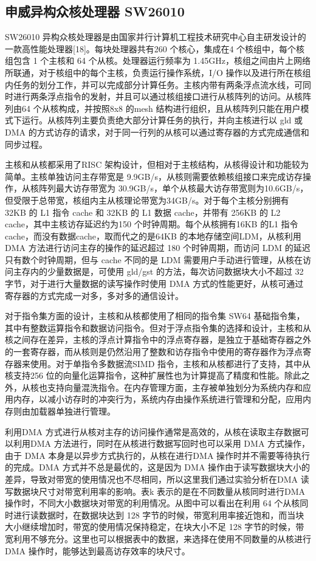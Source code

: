 \subsection{申威异构众核处理器 SW26010}
SW26010 异构众核处理器是由国家并行计算机工程技术研究中心自主研发设计的一款高性能处理器[18]。每块处理器共有260 个核心，集成在4 个核组中，每个核组包含 1 个主核和 64 个从核。处理器运行频率为 1.45GHz，核组之间由片上网络所联通，对于核组中的每个主核，负责运行操作系统，I/O 操作以及进行所在核组内任务的划分工作，并可以完成部分计算任务。主核内带有两条浮点流水线，可同时进行两条浮点指令的发射，并且可以通过核组接口进行从核阵列的访问。从核阵列由64 个从核构成，并按照8x8 的mesh 结构进行组织，且从核阵列只能在用户模式下运行。从核阵列主要负责绝大部分计算任务的执行，并向主核进行以 gld 或 DMA 的方式访存的请求，对于同一行列的从核可以通过寄存器的方式完成通信和同步过程。

主核和从核都采用了RISC 架构设计，但相对于主核结构，从核得设计和功能较为简单。主核单独访问主存带宽是 9.9GB/s，从核则需要依赖核组接口来完成访存操作，从核阵列最大访存带宽为 30.9GB/s，单个从核最大访存带宽则为10.6GB/s，但受限于总带宽，核组内主从核理论带宽为34GB/s。对于每个主核分别拥有 32KB 的 L1 指令 cache 和 32KB 的 L1 数据 cache，并带有 256KB 的 L2 cache，其中主核访存延迟约为150 个时钟周期。每个从核拥有16KB 的L1 指令cache，而没有数据cache，取而代之的是64KB 的本地存储空间LDM，从核利用DMA 方法进行访问主存的操作的延迟超过 180 个时钟周期，而访问 LDM 的延迟只有数个时钟周期，但与 cache 不同的是 LDM 需要用户手动进行管理，从核在访问主存内的少量数据是，可使用 gld/gst 的方法，每次访问数据块大小不超过 32 字节，对于进行大量数据的读写操作时使用 DMA 方式的性能更好，从核可通过寄存器的方式完成一对多，多对多的通信设计。

对于指令集方面的设计，主核和从核都使用了相同的指令集 SW64 基础指令集，其中有整数运算指令和数据访问指令。但对于浮点指令集的选择和设计，主核和从核之间存在差异，主核的浮点计算指令中的浮点寄存器，是独立于基础寄存器之外的一套寄存器，而从核则是仍然沿用了整数和访存指令中使用的寄存器作为浮点寄存器来使用。对于单指令多数据流SIMD 指令，主核和从核都进行了支持，其中从核支持256 位的向量化运算指令，这种扩展性也为计算提高了精度和性能。除此之外，从核也支持向量混洗指令。在内存管理方面，主存被单独划分为系统内存和应用内存，以减小访存时的冲突行为，系统内存由操作系统进行管理和分配，应用内存则由加载器单独进行管理。

利用DMA 方式进行从核对主存的访问操作通常是高效的，从核在读取主存数据可以利用DMA 方法进行，同时在从核进行数据写回时也可以采用 DMA 方式操作，由于 DMA 本身是以异步方式执行的，从核在进行DMA 操作时并不需要等待执行的完成。DMA 方式并不总是最优的，这是因为 DMA 操作由于读写数据块大小的差异，导致对带宽的使用情况也不尽相同，所以这里我们通过实验分析在DMA 读写数据块尺寸对带宽利用率的影响。表k 表示的是在不同数量从核同时进行DMA 操作时，不同大小数据块对带宽的利用情况。从图中可以看出在利用 64 个从核同时进行读数据时，在数据块达到 128 字节的时候，带宽利用率接近饱和，而当块大小继续增加时，带宽的使用情况保持稳定，在块大小不足 128 字节的时候，带宽利用不够充分。这里也可以根据表中的数据，来选择在使用不同数量的从核进行 DMA 操作时，能够达到最高访存效率的块尺寸。

